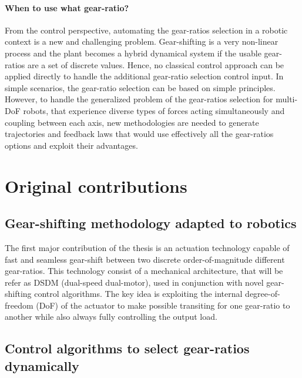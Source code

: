\paragraph{When to use what gear-ratio?}
From the control perspective, automating the gear-ratios selection in a robotic context is a new and challenging problem. Gear-shifting is a very non-linear process and the plant becomes a hybrid dynamical system if the usable gear-ratios are a set of discrete values. Hence, no classical control approach can be applied directly to handle the additional gear-ratio selection control input. In simple scenarios, the gear-ratio selection can be based on simple principles. However, to handle the generalized problem of the gear-ratios selection for multi-DoF robots, that experience diverse types of forces acting simultaneously and coupling between each axis, new methodologies are needed to generate trajectories and feedback laws that would use effectively all the gear-ratios options and exploit their advantages.


\newpage

\section{Original contributions}
\label{sec:contribution}


\subsection{Gear-shifting methodology adapted to robotics}

The first major contribution of the thesis is an actuation technology capable of fast and seamless gear-shift between two discrete order-of-magnitude different gear-ratios. This technology consist of a mechanical architecture, that will be refer as DSDM (dual-speed dual-motor), used in conjunction with novel gear-shifting control algorithms. The key idea is exploiting the internal degree-of-freedom (DoF) of the actuator to make possible transiting for one gear-ratio to another while also always fully controlling the output load. 

\subsection{Control algorithms to select gear-ratios dynamically}

